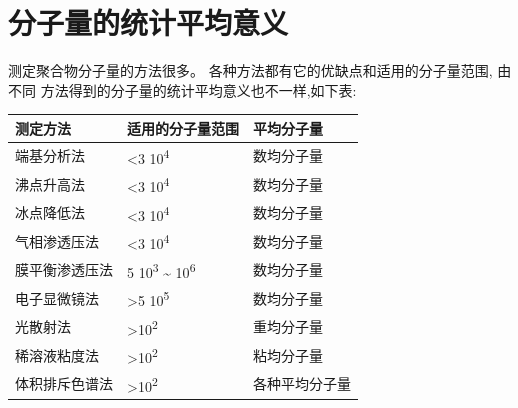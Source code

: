 \documentclass[11pt]{report}
\begin{document}
\chapter{分子量的统计平均意义}
\label{sec:org42d7487}
   测定聚合物分子量的方法很多。 各种方法都有它的优缺点和适用的分子量范围, 由不同
方法得到的分子量的统计平均意义也不一样,如下表:
\begin{center}
\begin{tabular}{lll}
测定方法 & 适用的分子量范围 & 平均分子量\\
\hline
端基分析法 & <3\texttimes{} 10\textsuperscript{4} & 数均分子量\\
沸点升高法 & <3\texttimes{} 10\textsuperscript{4} & 数均分子量\\
冰点降低法 & <3\texttimes{} 10\textsuperscript{4} & 数均分子量\\
气相渗透压法 & <3\texttimes{} 10\textsuperscript{4} & 数均分子量\\
膜平衡渗透压法 & 5\texttimes{} 10\textsuperscript{3} \textasciitilde{} 10\textsuperscript{6} & 数均分子量\\
电子显微镜法 & >5\texttimes{} 10\textsuperscript{5} & 数均分子量\\
光散射法 & >10\textsuperscript{2} & 重均分子量\\
稀溶液粘度法 & >10\textsuperscript{2} & 粘均分子量\\
体积排斥色谱法 & >10\textsuperscript{2} & 各种平均分子量\\
\end{tabular}
\end{center}
\end{document}
